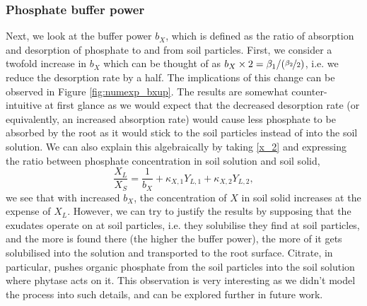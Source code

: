 \documentclass[11pt]{article}
\numberwithin{equation}{section}
\begin{document}
\subsubsection{Phosphate buffer power}
\label{sec:numexp_bx}
Next, we look at the buffer power $b_X$, which is defined as the ratio of absorption and desorption of phosphate to and from soil particles. First, we consider a twofold increase in $b_X$ which can be thought of as $b_X \times 2 = \beta_1 / (  \nicefrac{\beta_2}{2} )$, i.e. we reduce the desorption rate by a half. The implications of this change can be observed in Figure \ref{fig:numexp_bxup}. The results are somewhat counter-intuitive at first glance as we would expect that the decreased desorption rate (or equivalently, an increased absorption rate) would cause less phosphate to be absorbed by the root as it would stick to the soil particles instead of into the soil solution. We can also explain this algebraically by taking \eqref{x_2} and expressing the ratio between phosphate concentration in soil solution and soil solid,
\begin{equation}
    \frac{X_L}{X_S} = \frac{1}{b_X} + \kappa_{X,1} Y_{L,1} + \kappa_{X,2} Y_{L,2},
\end{equation}
we see that with increased $b_X$, the concentration of $X$ in soil solid increases at the expense of $X_L$. However, we can try to justify the results by supposing that the exudates operate on  at soil particles, i.e. they solubilise  they find at soil particles, and the more  is found there (the higher the buffer power), the more of it gets solubilised into the solution and transported to the root surface. Citrate, in particular, pushes organic phosphate from the soil particles into the soil solution where phytase acts on it. This observation is very interesting as we didn't model the process into such details, and can be explored further in future work.
\end{document}
